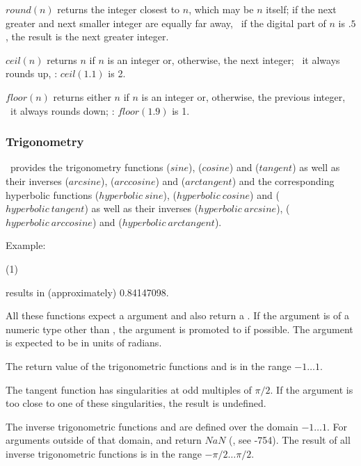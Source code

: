$round(n)$ returns the integer closest to $n$,
which may be $n$ itself; if the next greater and
next smaller integer are equally far away,
\ie\ if the digital part of $n$ is $.5$,
the result is the next greater integer.

$ceil(n)$ returns $n$ if $n$ is an integer or,
otherwise, the next integer;
\ie\ it always rounds up, \eg: $ceil(1.1)$ is 2.

$floor(n)$ returns either $n$ if $n$ is an integer
or, otherwise, the previous integer, \ie\ it always rounds down;
\eg: $floor(1.9)$ is 1.

\subsubsection{Trigonometry}
\nowdb\ provides the trigonometry functions
 ($sine$),
 ($cosine$) and
 ($tangent$)
as well as their inverses
 ($arcsine$),
 ($arccosine$) and
 ($arctangent$) and
the corresponding hyperbolic functions
 ($hyperbolic\ sine$),
 ($hyperbolic\ cosine$) and
 ($hyperbolic\ tangent$)
as well as their inverses
 ($hyperbolic\ arcsine$),
 ($hyperbolic\ arccosine$) and
 ($hyperbolic\ arctangent$).

Example:

 (1)
 

results in (approximately) 0.84147098.

All these functions expect a  argument
and also return a .
If the argument is of a numeric type other than ,
the argument is promoted to  if possible.
The argument is expected to be in units of radians.

The return value of the trigonometric functions
 and  is in the range $-1\dots 1$.

The tangent function has singularities at odd multiples of $\pi/2$.
If the argument is too close to one of these singularities,
the result is undefined.

The inverse trigonometric functions
 and 
are defined over the domain $-1\dots 1$.
For arguments outside of that domain,
 and 
return $NaN$ (, see -754).
The result of all inverse trigonometric functions
is in the range $-\pi/2\dots\pi/2$.

